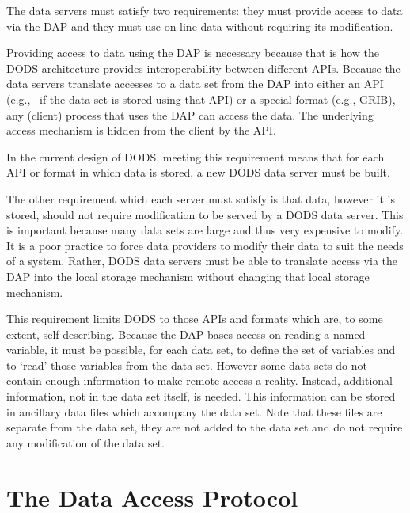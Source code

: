 The data servers must satisfy two requirements: they must provide access to
data via the DAP and they must use on-line data without requiring its
modification. 

Providing access to data using the DAP is necessary because that is how the
DODS architecture provides interoperability between different APIs. Because
the data servers translate accesses to a data set from the DAP into either
an API (e.g., \netcdf\ if the data set is stored using that API) or a special
format (e.g., GRIB), any (client) process that uses the DAP can access the
data. The underlying access mechanism is hidden from the client by the API. 

In the current design of DODS, meeting this requirement means that for
each API or format in which data is stored, a new DODS data server must be
built.

The other requirement which each server must satisfy is that data, however it
is stored, should not require modification to be served by a DODS data
server. This is important because many data sets are large and thus very
expensive to modify. It is a poor practice to force data providers to modify
their data to suit the needs of a system. Rather, DODS data servers must be
able to translate access via the DAP into the local storage mechanism
without changing that local storage mechanism.

This requirement limits DODS to those APIs and formats which are, to some
extent, self-describing. Because the DAP bases access on reading a named
variable, it must be possible, for each data set, to define the set of
variables and to `read' those variables from the data set. However some data
sets do not contain enough information to make remote access a
reality. Instead, additional information, not in the data set itself, is
needed. This information can be stored in ancillary data files which
accompany the data set. Note that these files are separate from the data
set, they are not added to the data set and do not require any modification
of the data set. 


\section{The Data Access Protocol}
\label{www:dap}


